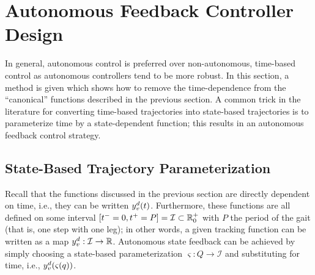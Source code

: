 \section{Autonomous Feedback Controller Design} \noindent
In general, autonomous control is preferred over non-autonomous, time-based control as autonomous controllers tend to be more robust. In this section, a method is given which shows how to remove the time-dependence from the ``canonical'' functions described in the previous section. A common trick in the literature\cite{WGCCM07}\xspace for converting time-based trajectories into state-based trajectories is to parameterize time by a state-dependent function; this results in an autonomous feedback control strategy.

\subsection{State-Based Trajectory Parameterization} \noindent
Recall that the functions discussed in the previous section are directly dependent on time, i.e., they can be written $y_{v}^{d}(t)$. Furthermore, these functions are all defined on some interval $[t^- = 0, t^+ = P] = \mathcal{I} \subset \mathbb{R}_{0}^{+}$ with $P$ the period of the gait (that is, one step with one leg); in other words, a given tracking function can be written as a map $y_{v}^{d} : \mathcal{I} \to \mathbb{R}$. Autonomous state feedback can be achieved by simply choosing a state-based parameterization $\varsigma : Q \to \mathcal{I}$ and substituting for time, i.e., $y_{v}^{d}(\varsigma(q))$.

